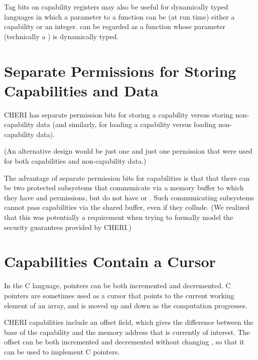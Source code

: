 Tag bits on capability registers may also be useful for dynamically typed
languages in which a parameter to a function can be (at run time) either a
capability or an integer.  can be regarded as
a function whose parameter (technically a ) is
dynamically typed.

\section{Separate Permissions for Storing Capabilities and Data}

CHERI has separate permission bits for storing a capability versus storing
non-capability data (and similarly, for loading a capability versus loading
non-capability data).

(An alternative design would be just one \cappermL{} and just one
\cappermS{} permission that were used for both capabilities and non-capability data.)

The advantage of separate permission bits for capabilities is that
that there can be two protected subsystems that communicate via a memory
buffer to which they have \cappermL{} and \cappermS{} permissions, but
do not have \cappermLC{} or \cappermSC{}. Such
communicating subsystems cannot pass capabilities via the shared buffer, even
if they collude. (We realized that this was potentially a requirement when
trying to formally model the security guarantees provided by CHERI.)

\section{Capabilities Contain a Cursor}

In the C language, pointers can be both incremented and decremented.
C pointers are sometimes used as a cursor that points to the current working
element of an array, and is moved up and down as the computation progresses.

CHERI capabilities include an offset field, which gives the difference between
the base of the capability and the memory address that is currently of
interest. The offset can be both incremented and decremented without changing
\cbase{}, so that it can be used to implement C pointers.

